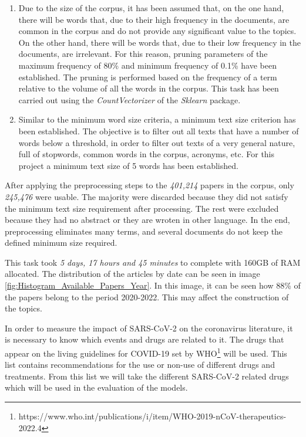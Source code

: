 \documentclass[a4paper,10pt]{article}
\begin{document}
\begin{enumerate}
    \item Due to the size of the corpus, it has been assumed that, on the one hand, there will be words that, due to their high frequency in the documents, are common in the corpus and do not provide any significant value to the topics. On the other hand, there will be words that, due to their low frequency in the documents, are irrelevant. For this reason, pruning parameters of the maximum frequency of 80\% and minimum frequency of 0.1\% have been established. The pruning is performed based on the frequency of a term relative to the volume of all the words in the corpus. This task has been carried out using the \textit{CountVectorizer} of the \textit{Sklearn} package.

    \item Similar to the minimum word size criteria, a minimum text size criterion has been established. The objective is to filter out all texts that have a number of words below a threshold, in order to filter out texts of a very general nature, full of stopwords, common words in the corpus, acronyms, etc. For this project a minimum text size of 5 words has been established.
\end{enumerate}


After applying the preprocessing steps to the \textit{401,214} papers in the corpus, only \textit{245,476} were usable. The majority were discarded because they did not satisfy the minimum text size requirement after processing. The rest were excluded because they had no abstract or they are wroten in other language. In the end, preprocessing eliminates many terms, and several documents do not keep the defined minimum size required.

This task took \textit{5 days, 17 hours and 45 minutes} to complete with 160GB of RAM allocated. The distribution of the articles by date can be seen in image \ref{fig:Histogram_Available_Papers_Year}. In this image, it can be seen how 88\% of the papers belong to the period 2020-2022. This may affect the construction of the topics.

In order to measure the impact of SARS-CoV-2 on the coronavirus literature, it is necessary to know which events and drugs are related to it. The drugs that appear on the living guidelines for COVID-19 set by WHO\footnote{https://www.who.int/publications/i/item/WHO-2019-nCoV-therapeutics-2022.4} will be used. This list contains recommendations for the use or non-use of different drugs and treatments. From this list we will take the different SARS-CoV-2 related drugs which will be used in the evaluation of the models.
\end{document}
